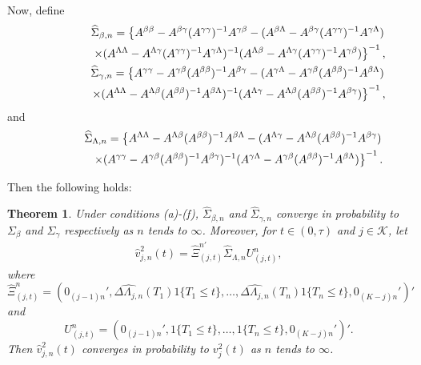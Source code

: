 \documentclass{statsoc}
\newtheorem{theorem}{Theorem}[section]
\begin{document}
Now, define 
\begin{eqnarray*}
&&\widehat\Sigma_{\beta,n}=\left\{A^{\beta\beta}-A^{\beta\gamma}(A^{\gamma\gamma})^{-1}A^{\gamma\beta}-(A^{\beta\Lambda}- A^{\beta\gamma}(A^{\gamma\gamma})^{-1}A^{\gamma\Lambda})\right.\\
&&\hspace{1.5cm}\left.\times(A^{\Lambda\Lambda}-A^{\Lambda\gamma}(A^{\gamma\gamma})^{-1}A^{\gamma\Lambda})^{-1}(A^{\Lambda\beta}-A^{\Lambda\gamma}(A^{\gamma\gamma})^{-1}A^{\gamma\beta})\right\}^{-1},\\
&&\widehat\Sigma_{\gamma,n}=\left\{A^{\gamma\gamma}-A^{\gamma\beta}(A^{\beta\beta})^{-1}A^{\beta\gamma}-(A^{\gamma\Lambda}- A^{\gamma\beta}(A^{\beta\beta})^{-1}A^{\beta\Lambda})\right.\\
&&\hspace{1.5cm}\left.\times(A^{\Lambda\Lambda}-A^{\Lambda\beta}(A^{\beta\beta})^{-1}A^{\beta\Lambda})^{-1}(A^{\Lambda\gamma}-A^{\Lambda\beta}(A^{\beta\beta})^{-1}A^{\beta\gamma})\right\}^{-1},
\end{eqnarray*}
and
\begin{eqnarray*}
&&\widehat\Sigma_{\Lambda,n} =\left\{A^{\Lambda\Lambda}-A^{\Lambda\beta}(A^{\beta\beta})^{-1}A^{\beta\Lambda}-(A^{\Lambda\gamma}- A^{\Lambda\beta}(A^{\beta\beta})^{-1}A^{\beta\gamma})\right.\\
&&\hspace{1.5cm}\left.\times(A^{\gamma\gamma}-A^{\gamma\beta}(A^{\beta\beta})^{-1}A^{\beta\gamma})^{-1}(A^{\gamma\Lambda}-A^{\gamma\beta}(A^{\beta\beta})^{-1}A^{\beta\Lambda})\right\}^{-1}.
\end{eqnarray*}

Then the following holds:

\begin{theorem}\label{varasymp}
Under conditions (a)-(f), $\widehat\Sigma_{\beta,n}$ and $\widehat\Sigma_{\gamma,n}$ converge in probability to $\Sigma_\beta$ and $\Sigma_\gamma$ respectively as $n$ tends to $\infty$. Moreover, for $t\in(0,\tau)$ and $j\in\mathcal K$, let
\begin{eqnarray*}
\widehat v^2_{j,n}(t)=\widehat \Xi_{(j,t)}^{n'}\widehat\Sigma_{\Lambda,n} U_{(j,t)}^n,
\end{eqnarray*}
where $$\widehat \Xi_{(j,t)}^n=\left(0_{(j-1)n}',\widehat{\Delta \Lambda_{j,n}}(T_1) 1\{T_1\leq t\},\ldots,\widehat{\Delta \Lambda_{j,n}}(T_n) 1\{T_n\leq t\},0_{(K-j)n}'\right)'$$ and $$U_{(j,t)}^n=(0_{(j-1)n}',1\{T_1\leq t\},\ldots,1\{T_n\leq t\},0_{(K-j)n}')'.$$ Then $\widehat v^2_{j,n}(t)$ converges  in probability to $v^2_j(t)$ as $n$ tends to $\infty$.
\end{theorem}
\end{document}
